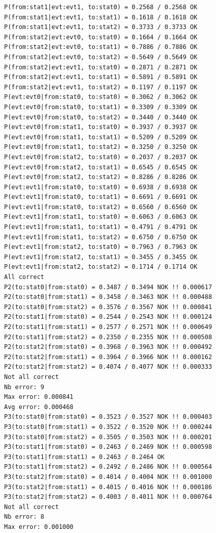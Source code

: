 \documentclass[12pt, a4paper]{article}
\begin{document}
\begin{scriptsize}
\begin{ttfamily}
\begin{lstlisting}
P(from:stat1|evt:evt1, to:stat0) = 0.2568 / 0.2568 OK
P(from:stat1|evt:evt1, to:stat1) = 0.1618 / 0.1618 OK
P(from:stat1|evt:evt1, to:stat2) = 0.3733 / 0.3733 OK
P(from:stat2|evt:evt0, to:stat0) = 0.1664 / 0.1664 OK
P(from:stat2|evt:evt0, to:stat1) = 0.7886 / 0.7886 OK
P(from:stat2|evt:evt0, to:stat2) = 0.5649 / 0.5649 OK
P(from:stat2|evt:evt1, to:stat0) = 0.2871 / 0.2871 OK
P(from:stat2|evt:evt1, to:stat1) = 0.5891 / 0.5891 OK
P(from:stat2|evt:evt1, to:stat2) = 0.1197 / 0.1197 OK
P(evt:evt0|from:stat0, to:stat0) = 0.3062 / 0.3062 OK
P(evt:evt0|from:stat0, to:stat1) = 0.3309 / 0.3309 OK
P(evt:evt0|from:stat0, to:stat2) = 0.3440 / 0.3440 OK
P(evt:evt0|from:stat1, to:stat0) = 0.3937 / 0.3937 OK
P(evt:evt0|from:stat1, to:stat1) = 0.5209 / 0.5209 OK
P(evt:evt0|from:stat1, to:stat2) = 0.3250 / 0.3250 OK
P(evt:evt0|from:stat2, to:stat0) = 0.2037 / 0.2037 OK
P(evt:evt0|from:stat2, to:stat1) = 0.6545 / 0.6545 OK
P(evt:evt0|from:stat2, to:stat2) = 0.8286 / 0.8286 OK
P(evt:evt1|from:stat0, to:stat0) = 0.6938 / 0.6938 OK
P(evt:evt1|from:stat0, to:stat1) = 0.6691 / 0.6691 OK
P(evt:evt1|from:stat0, to:stat2) = 0.6560 / 0.6560 OK
P(evt:evt1|from:stat1, to:stat0) = 0.6063 / 0.6063 OK
P(evt:evt1|from:stat1, to:stat1) = 0.4791 / 0.4791 OK
P(evt:evt1|from:stat1, to:stat2) = 0.6750 / 0.6750 OK
P(evt:evt1|from:stat2, to:stat0) = 0.7963 / 0.7963 OK
P(evt:evt1|from:stat2, to:stat1) = 0.3455 / 0.3455 OK
P(evt:evt1|from:stat2, to:stat2) = 0.1714 / 0.1714 OK
All correct
P2(to:stat0|from:stat0) = 0.3487 / 0.3494 NOK !! 0.000617
P2(to:stat0|from:stat1) = 0.3458 / 0.3463 NOK !! 0.000488
P2(to:stat0|from:stat2) = 0.3576 / 0.3567 NOK !! 0.000841
P2(to:stat1|from:stat0) = 0.2544 / 0.2543 NOK !! 0.000124
P2(to:stat1|from:stat1) = 0.2577 / 0.2571 NOK !! 0.000649
P2(to:stat1|from:stat2) = 0.2350 / 0.2355 NOK !! 0.000508
P2(to:stat2|from:stat0) = 0.3968 / 0.3963 NOK !! 0.000492
P2(to:stat2|from:stat1) = 0.3964 / 0.3966 NOK !! 0.000162
P2(to:stat2|from:stat2) = 0.4074 / 0.4077 NOK !! 0.000333
Not all correct
Nb error: 9
Max error: 0.000841
Avg error: 0.000468
P3(to:stat0|from:stat0) = 0.3523 / 0.3527 NOK !! 0.000403
P3(to:stat0|from:stat1) = 0.3522 / 0.3520 NOK !! 0.000244
P3(to:stat0|from:stat2) = 0.3505 / 0.3503 NOK !! 0.000201
P3(to:stat1|from:stat0) = 0.2463 / 0.2469 NOK !! 0.000598
P3(to:stat1|from:stat1) = 0.2463 / 0.2464 OK
P3(to:stat1|from:stat2) = 0.2492 / 0.2486 NOK !! 0.000564
P3(to:stat2|from:stat0) = 0.4014 / 0.4004 NOK !! 0.001000
P3(to:stat2|from:stat1) = 0.4015 / 0.4016 NOK !! 0.000186
P3(to:stat2|from:stat2) = 0.4003 / 0.4011 NOK !! 0.000764
Not all correct
Nb error: 8
Max error: 0.001000

\end{lstlisting}
\end{ttfamily}
\end{scriptsize}
\end{document}
